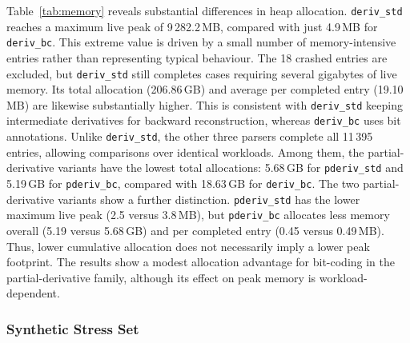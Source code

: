 Table~\ref{tab:memory} reveals substantial
differences in heap allocation.
\texttt{deriv\_std} reaches a maximum live peak
of 9\,282.2\,MB, compared with just 4.9\,MB
for \texttt{deriv\_bc}.
This extreme value is driven by a small number
of memory-intensive entries rather than
representing typical behaviour.
The 18 crashed entries are excluded, but
\texttt{deriv\_std} still completes cases
requiring several gigabytes of live memory.
Its total allocation (206.86\,GB) and
average per completed entry (19.10\,MB)
are likewise substantially higher.
This is consistent with \texttt{deriv\_std}
keeping intermediate derivatives for
backward reconstruction, whereas
\texttt{deriv\_bc} uses bit annotations.
Unlike \texttt{deriv\_std}, the other three
parsers complete all 11\,395 entries,
allowing comparisons over identical workloads.
Among them, the partial-derivative variants
have the lowest total allocations:
5.68\,GB for \texttt{pderiv\_std} and
5.19\,GB for \texttt{pderiv\_bc},
compared with 18.63\,GB for \texttt{deriv\_bc}.
The two partial-derivative variants show
a further distinction.
\texttt{pderiv\_std} has the lower maximum
live peak (2.5 versus 3.8\,MB),
but \texttt{pderiv\_bc} allocates less
memory overall (5.19 versus 5.68\,GB)
and per completed entry (0.45 versus 0.49\,MB).
Thus, lower cumulative allocation does not
necessarily imply a lower peak footprint.
The results show a modest allocation advantage
for bit-coding in the partial-derivative family,
although its effect on peak memory is
workload-dependent.


%
%
%

\subsubsection{Synthetic Stress Set}
\label{sec:eval-memory-pathological}

%


